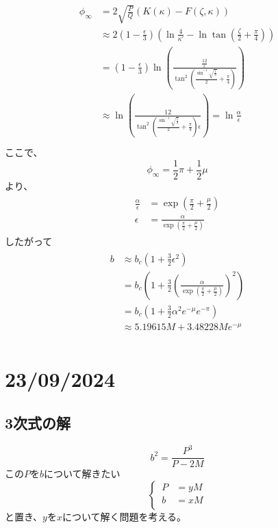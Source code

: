\documentclass[dvipdfmx]{report} %
\begin{document}
\begin{eqnarray*}
\begin{split}
	\phi_{\infty} &= 2\sqrt{ \frac{P}{Q} }\left( K(\kappa) - F(\zeta, \kappa) \right)\\
	&\approx 2\left( 1 - \frac{\epsilon}{3} \right) \left( \ln \frac{4}{\kappa'} - \ln \tan \left( \frac{\zeta}{2} + \frac{\pi}{4} \right) \right)\\
	&= \left( 1 - \frac{\epsilon}{3} \right) \ln \left( \frac{ \frac{12}{\epsilon} }{ \tan^2 \left( \frac{\sin^{-1} \sqrt{\frac{1}{3}}}{2} + \frac{\pi}{4} \right) } \right)\\
	&\approx \ln \left( \frac{ 12 }{ \tan^2 \left( \frac{\sin^{-1} \sqrt{\frac{1}{3}}}{2} + \frac{\pi}{4} \right) \epsilon } \right) = \ln \frac{\alpha}{\epsilon}\\
\end{split}
\end{eqnarray*}
ここで、
\[ \phi_\infty = \frac{1}{2}\pi + \frac{1}{2}\mu \]
より、
\begin{eqnarray*}
\begin{split}
	\frac{\alpha}{\epsilon} &= \exp \left( \frac{\pi}{2} + \frac{\mu}{2} \right)\\
	\epsilon &= \frac{ \alpha }{ \exp \left( \frac{\pi}{2} + \frac{\mu}{2} \right) }
\end{split}
\end{eqnarray*}
したがって
\begin{eqnarray*}
\begin{split}
	b &\approx b_c \left( 1 + \frac{3}{2}\epsilon^2 \right)\\
	&= b_c \left( 1 + \frac{3}{2} \left( \frac{ \alpha }{ \exp \left( \frac{\pi}{2} + \frac{\mu}{2} \right) } \right)^2 \right)\\
	&= b_c \left( 1 + \frac{3}{2} \alpha^2 e^{-\mu} e^{-\pi} \right)\\
	&\approx 5.19615M + 3.48228Me^{-\mu}\\
\end{split}
\end{eqnarray*}

\chapter{23/09/2024}
\section{3次式の解}

\[ b^2 = \frac{P^3}{P-2M} \]
この$P$を$b$について解きたい
\begin{equation*}
\left\{ \,
\begin{aligned}
	P &= yM\\
	b &= xM\\
\end{aligned}
\right.
\end{equation*}
と置き、$y$を$x$について解く問題を考える。
\end{document}
